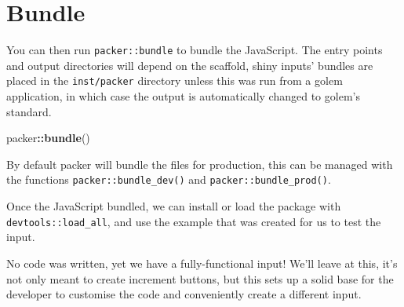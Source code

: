 \documentclass[10pt,]{krantz}
\makeatletter
\newenvironment{Shaded}{\begin{snugshade}}{\end{snugshade}}
\newcommand{\ControlFlowTok}[1]{\textcolor[rgb]{0.27,0.27,0.27}{\textbf{#1}}}
\newcommand{\DecValTok}[1]{\textcolor[rgb]{0.06,0.06,0.06}{#1}}
\newcommand{\KeywordTok}[1]{\textcolor[rgb]{0.27,0.27,0.27}{\textbf{#1}}}
\newcommand{\NormalTok}[1]{#1}
\newcommand{\OperatorTok}[1]{\textcolor[rgb]{0.43,0.43,0.43}{\textbf{#1}}}
\newcommand{\StringTok}[1]{\textcolor[rgb]{0.5,0.5,0.5}{#1}}
\newenvironment{kframe}{%
\medskip{}
\setlength{\fboxsep}{.8em}
 \def\at@end@of@kframe{}%
 \ifinner\ifhmode%
  \def\at@end@of@kframe{\end{minipage}}%
  \begin{minipage}{\columnwidth}%
 \fi\fi%
 \def\FrameCommand##1{\hskip\@totalleftmargin \hskip-\fboxsep
 \colorbox{shadecolor}{##1}\hskip-\fboxsep
     \hskip-\linewidth \hskip-\@totalleftmargin \hskip\columnwidth}%
 \MakeFramed {\advance\hsize-\width
   \@totalleftmargin\z@ \linewidth\hsize
   \@setminipage}}%
 {\par\unskip\endMakeFramed%
 \at@end@of@kframe}
\renewenvironment{Shaded}{\begin{kframe}}{\end{kframe}}
\makeatother
\begin{document}
\hypertarget{packer-bundle}{%
\section{Bundle}\label{packer-bundle}}

You can then run \texttt{packer::bundle} to bundle the JavaScript. The entry points and output directories will depend on the scaffold, shiny inputs' bundles are placed in the \texttt{inst/packer} directory unless this was run from a golem application, in which case the output is automatically changed to golem's standard.

\begin{Shaded}
\begin{Highlighting}[]
\NormalTok{packer}\OperatorTok{::}\KeywordTok{bundle}\NormalTok{()}
\end{Highlighting}
\end{Shaded}

By default packer will bundle the files for production, this can be managed with the functions \texttt{packer::bundle\_dev()} and \texttt{packer::bundle\_prod()}.

Once the JavaScript bundled, we can install or load the package with \texttt{devtools::load\_all}, and use the example that was created for us to test the input.

\begin{Shaded}
\end{Shaded}

No code was written, yet we have a fully-functional input! We'll leave at this, it's not only meant to create increment buttons, but this sets up a solid base for the developer to customise the code and conveniently create a different input.
\end{document}
